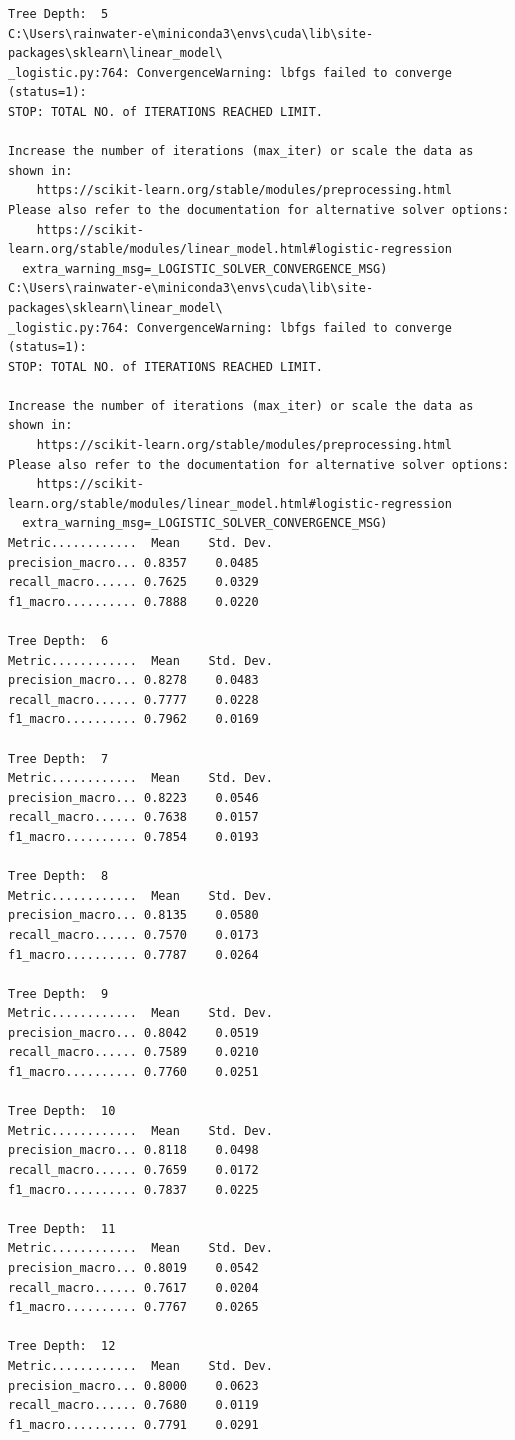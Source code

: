 \documentclass[12pt]{article}
\begin{document}
\begin{verbatim}
Tree Depth:  5
C:\Users\rainwater-e\miniconda3\envs\cuda\lib\site-packages\sklearn\linear_model\
_logistic.py:764: ConvergenceWarning: lbfgs failed to converge (status=1):
STOP: TOTAL NO. of ITERATIONS REACHED LIMIT.

Increase the number of iterations (max_iter) or scale the data as shown in:
    https://scikit-learn.org/stable/modules/preprocessing.html
Please also refer to the documentation for alternative solver options:
    https://scikit-learn.org/stable/modules/linear_model.html#logistic-regression
  extra_warning_msg=_LOGISTIC_SOLVER_CONVERGENCE_MSG)
C:\Users\rainwater-e\miniconda3\envs\cuda\lib\site-packages\sklearn\linear_model\
_logistic.py:764: ConvergenceWarning: lbfgs failed to converge (status=1):
STOP: TOTAL NO. of ITERATIONS REACHED LIMIT.

Increase the number of iterations (max_iter) or scale the data as shown in:
    https://scikit-learn.org/stable/modules/preprocessing.html
Please also refer to the documentation for alternative solver options:
    https://scikit-learn.org/stable/modules/linear_model.html#logistic-regression
  extra_warning_msg=_LOGISTIC_SOLVER_CONVERGENCE_MSG)
Metric............  Mean    Std. Dev.
precision_macro... 0.8357    0.0485
recall_macro...... 0.7625    0.0329
f1_macro.......... 0.7888    0.0220

Tree Depth:  6
Metric............  Mean    Std. Dev.
precision_macro... 0.8278    0.0483
recall_macro...... 0.7777    0.0228
f1_macro.......... 0.7962    0.0169

Tree Depth:  7
Metric............  Mean    Std. Dev.
precision_macro... 0.8223    0.0546
recall_macro...... 0.7638    0.0157
f1_macro.......... 0.7854    0.0193

Tree Depth:  8
Metric............  Mean    Std. Dev.
precision_macro... 0.8135    0.0580
recall_macro...... 0.7570    0.0173
f1_macro.......... 0.7787    0.0264

Tree Depth:  9
Metric............  Mean    Std. Dev.
precision_macro... 0.8042    0.0519
recall_macro...... 0.7589    0.0210
f1_macro.......... 0.7760    0.0251

Tree Depth:  10
Metric............  Mean    Std. Dev.
precision_macro... 0.8118    0.0498
recall_macro...... 0.7659    0.0172
f1_macro.......... 0.7837    0.0225

Tree Depth:  11
Metric............  Mean    Std. Dev.
precision_macro... 0.8019    0.0542
recall_macro...... 0.7617    0.0204
f1_macro.......... 0.7767    0.0265

Tree Depth:  12
Metric............  Mean    Std. Dev.
precision_macro... 0.8000    0.0623
recall_macro...... 0.7680    0.0119
f1_macro.......... 0.7791    0.0291


\end{verbatim}
\end{document}
